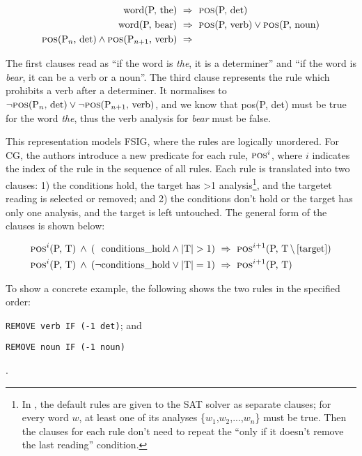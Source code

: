 \begin{align*}
\text{word(P, the)} \  &\Rightarrow \ \text{{\sc pos}(P, det)} \\
\text{word(P, bear)} \ &\Rightarrow \ \text{{\sc pos}(P, verb)} \vee \text{{\sc pos}(P, noun)} \\
\text{{\sc pos}(P$_n$, det)} \wedge \text{{\sc pos}(P$_{n+1}$, verb)} \ &\Rightarrow 
\end{align*}

\noindent The first clauses read as ``if the word is \emph{the}, it
is a determiner'' and ``if the word is \emph{bear}, it can be a verb or a noun''.
The third clause represents the rule which prohibits a verb after a
determiner. It normalises to $\neg \text{{\sc pos}(P$_n$, det)} \vee \neg \text{{\sc pos}(P$_{n+1}$, verb)}$, and we know that {\sc pos}(P, det) must be true for
the word \emph{the}, thus the verb analysis for \emph{bear} must be
false.

This representation models FSIG, where the rules are logically
unordered. For CG, the authors introduce a new predicate for each rule,
$\text{{\sc pos}}^i$, where $i$ indicates the index of the rule in the
sequence of all rules.
Each rule is translated into two
clauses: 1) the conditions hold, the target has >1 analysis\footnote{In \cite{listenmaa_claessen2015}, the default rules
  are given to the SAT solver as separate clauses; for every word
  $w$, at least one of its analyses \{$w_1$,$w_2$,...,$w_n$\} must be
  true. Then the clauses for each rule don't need to repeat the ``only
  if it doesn't remove the last reading'' condition.}, and the 
targetet reading is selected or removed; and
2) the conditions don't hold or the target has only one analysis, and the target is left untouched. The general form of the clauses is shown below:

\begin{align*}
\text{{\sc pos}}^i\text{(P, T)} \: \wedge \: (\;\:\,  \text{conditions\_hold}
\wedge  \text{|T|} > 1) \  &\Rightarrow \  \text{{\sc pos}}^{i+1}\text{(P, T$\,\setminus\,$[target])} \\
\text{{\sc pos}}^i\text{(P, T)} \: \wedge \: (\neg \text{conditions\_hold} \vee
\text{|T|} = 1) \  &\Rightarrow \ \text{{\sc pos}}^{i+1}\text{(P, T)}
\end{align*}


To show a concrete example, the following shows the two rules in the specified order:
\begin{inparaenum}
\def\labelenumi{\arabic{enumi}.}
\itemsep1pt\parskip0pt
\item \texttt{REMOVE verb IF (-1 det)}; and
\item  \texttt{REMOVE noun IF (-1 noun)}
\end{inparaenum}.

